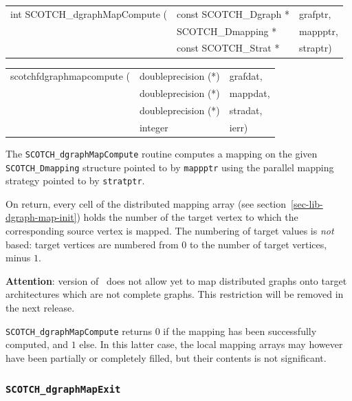 \begin{itemize}
\progsyn

{\tt\begin{tabular}{l@{}ll}
int SCOTCH\_dgraphMapCompute ( & const SCOTCH\_Dgraph * & grafptr, \\
                               & SCOTCH\_Dmapping *     & mappptr, \\
                               & const SCOTCH\_Strat *  & straptr)
\end{tabular}}

{\tt\begin{tabular}{l@{}ll}
scotchfdgraphmapcompute ( & doubleprecision (*) & grafdat, \\
                          & doubleprecision (*) & mappdat, \\
                          & doubleprecision (*) & stradat, \\
                          & integer             & ierr)
\end{tabular}}

\progdes

The {\tt SCOTCH\_dgraphMapCompute} routine computes a mapping
on the given {\tt SCOTCH\_\lbt Dmapping} structure pointed
to by {\tt mappptr} using the parallel mapping strategy pointed to
by {\tt stratptr}.

On return, every cell of the distributed mapping array (see
section~\ref{sec-lib-dgraph-map-init}) holds the number of the target
vertex to which the corresponding source vertex is mapped. The
numbering of target values is {\em not\/} based: target vertices are
numbered from $0$ to the number of target vertices, minus $1$.

{\bf Attention}: version {} of \scotch\ does not allow yet to
map distributed graphs onto target architectures which are not
complete graphs. This restriction will be removed in the next release.

\progret

{\tt SCOTCH\_dgraphMapCompute} returns $0$ if the mapping has been
successfully computed, and $1$ else. In this latter case, the local
mapping arrays may however have been partially or completely filled,
but their contents is not significant.
\end{itemize}

\subsubsection{{\tt SCOTCH\_dgraphMapExit}}

